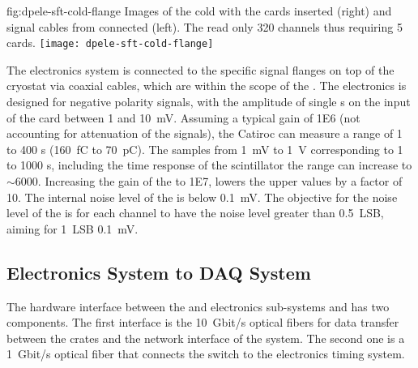 \begin{dunefigure}{fig:dpele-sft-cold-flange}
{Images of the   cold \fdth with the  cards inserted (right) and signal cables from  connected (left). The   read only \num{320} channels thus requiring \num{5}  cards.}
\texttt{[image: dpele-sft-cold-flange]}
\end{dunefigure}

The  electronics system is connected to the specific  signal \fdth flanges on top of the cryostat via coaxial cables, which are within the scope of the .
The  electronics is designed for negative polarity  signals, with the amplitude of single \phel{}s on the input of the card between \num{1} and \SI{10}{\milli\volt}. Assuming a typical  gain of \num{1E6} (not accounting for attenuation of the signals), the Catiroc  can measure a range of \num{1} to \num{400} \phel{}s (\SI{160}{\femto\coulomb} to \SI{70}{\pico\coulomb}). The  samples from \SI{1}{\milli\volt} to \SI{1}{\volt} corresponding to \num{1} to \num{1000} \phel{}s, including the time response of the scintillator the range can increase to $\sim$\num{6000}. Increasing the gain of the  to \num{1E7}, lowers the upper values by a factor of 10. The internal noise level of the  is below \SI{0.1}{\milli\volt}. The objective for the noise level of the  is for each channel to have the \rms noise level greater than \SI{0.5}{LSB}, aiming for \SI{1}{LSB} \SI{0.1}{\milli\volt}.

\subsection{Electronics System to DAQ System}
\label{sec:fddp-tpc-elec-intfc-daq}

The hardware interface between the \dual {} and  electronics sub-systems and  has two components. 
The first interface is the \SI{10}{Gbit/s} optical fibers for data transfer between the  crates and the network interface of the  system. The second one is a \SI{1}{Gbit/s} optical fiber that connects the   switch to the \dual electronics timing system.   

